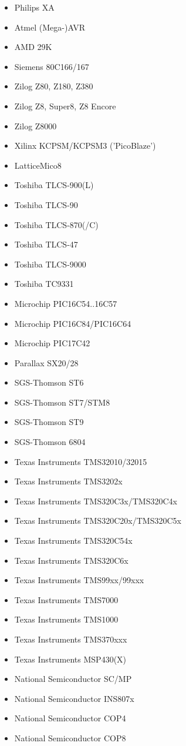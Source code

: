 \documentclass[12pt,twoside]{report}
\begin{document}
\begin{itemize}
\item{Philips XA}
\item{Atmel (Mega-)AVR}
\item{AMD 29K}
\item{Siemens 80C166/167}
\item{Zilog Z80, Z180, Z380}
\item{Zilog Z8, Super8, Z8 Encore}
\item{Zilog Z8000}
\item{Xilinx KCPSM/KCPSM3 ('PicoBlaze')}
\item{LatticeMico8}
\item{Toshiba TLCS-900(L)}
\item{Toshiba TLCS-90}
\item{Toshiba TLCS-870(/C)}
\item{Toshiba TLCS-47}
\item{Toshiba TLCS-9000}
\item{Toshiba TC9331}
\item{Microchip PIC16C54..16C57}
\item{Microchip PIC16C84/PIC16C64}
\item{Microchip PIC17C42}
\item{Parallax SX20/28}
\item{SGS-Thomson ST6}
\item{SGS-Thomson ST7/STM8}
\item{SGS-Thomson ST9}
\item{SGS-Thomson 6804}
\item{Texas Instruments TMS32010/32015}
\item{Texas Instruments TMS3202x}
\item{Texas Instruments TMS320C3x/TMS320C4x}
\item{Texas Instruments TMS320C20x/TMS320C5x}
\item{Texas Instruments TMS320C54x}
\item{Texas Instruments TMS320C6x}
\item{Texas Instruments TMS99xx/99xxx}
\item{Texas Instruments TMS7000}
\item{Texas Instruments TMS1000}
\item{Texas Instruments TMS370xxx}
\item{Texas Instruments MSP430(X)}
\item{National Semiconductor SC/MP}
\item{National Semiconductor INS807x}
\item{National Semiconductor COP4}
\item{National Semiconductor COP8}

\end{itemize}
\end{document}
